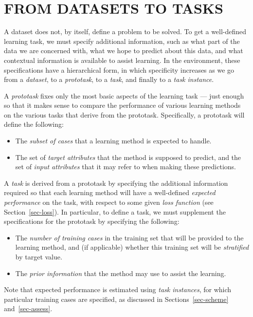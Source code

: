 %
%
\newpage

\section{FROM DATASETS TO TASKS}\label{sec-task}
\thispagestyle{plain}
\setcounter{figure}{0}

A dataset does not, by itself, define a problem to be solved.  To get
a well-defined learning task, we must specify additional information,
such as what part of the data we are concerned with, what we hope to
predict about this data, and what contextual information is available
to assist learning.  In the \delve{} environment, these specifications
have a hierarchical form, in which specificity increases as we go from
a \emph{dataset}, to a \emph{prototask}, to a \emph{task}, and finally
to a \emph{task instance}.

A \emph{prototask} fixes only the most basic aspects of the learning
task --- just enough so that it makes sense to compare the performance
of various learning methods on the various tasks that derive from the
prototask.  Specifically, a prototask will define the following:\vspace{-5pt}
\begin{itemize}
\item The \emph{subset of cases} that a learning method is expected to handle.
\item The set of \emph{target attributes} that the method is supposed to 
      predict, and the set of \emph{input attributes} that it may refer to
      when making these predictions.\vspace{-5pt}
\end{itemize}

A \emph{task} is derived from a prototask by specifying the additional
information required so that each learning method will have a
well-defined \emph{expected performance} on the task, with respect to some given
\emph{loss function} (see Section~\ref{sec-loss}).  In particular, to
define a task, we must supplement the specifications for the prototask
by specifying the following:\vspace{-5pt}
\begin{itemize} 
\item The \emph{number of training cases} in the training set
      that will be provided to the learning method, and (if applicable)
      whether this training set will be \emph{stratified} by target value.
\item The \emph{prior information} that the method may
      use to assist the learning.
\end{itemize}\vspace{-5pt}
Note that expected performance is estimated using \emph{task instances},
for which particular training cases are specified, as
discussed in Sections~\ref{sec-scheme} and~\ref{sec-assess}.


